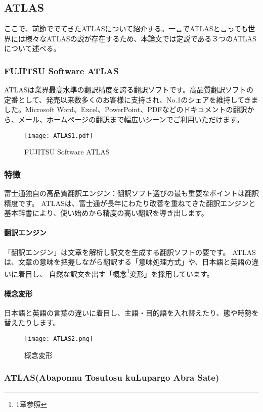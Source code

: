 \newpage
\subsection{ATLAS}
ここで、前節ででてきたATLASについて紹介する。一言でATLASと言っても世界には様々なATLASの説が存在するため、本論文では定説である３つのATLASについて述べる。

\subsubsection{FUJITSU Software ATLAS}
ATLASは業界最高水準の翻訳精度を誇る翻訳ソフトです。高品質翻訳ソフトの定番として、発売以来数多くのお客様に支持され、No.1のシェアを維持してきました。Microsoft Word、Excel、PowerPoint、PDFなどのドキュメントの翻訳から、メール、ホームページの翻訳まで幅広いシーンでご利用いただけます。

\begin{figure}[H]
\centering
\texttt{[image: ATLAS1.pdf]}
\caption{FUJITSU Software ATLAS}
\end{figure}

\subsubsection*{特徴}
富士通独自の高品質翻訳エンジン：翻訳ソフト選びの最も重要なポイントは翻訳精度です。 ATLASは、富士通が長年にわたり改善を重ねてきた翻訳エンジンと基本辞書により、使い始めから精度の高い翻訳を導き出します。
\paragraph{翻訳エンジン}
「翻訳エンジン」は文章を解析し訳文を生成する翻訳ソフトの要です。 ATLASは、文章の意味を把握しながら翻訳する「意味処理方式」や、日本語と英語の違いに着目し、 自然な訳文を出す「概念\footnote{1章参照}変形」を採用しています。
\paragraph*{概念変形}
日本語と英語の言葉の違いに着目し、主語・目的語を入れ替えたり、態や時勢を替えたりします。

\begin{figure}[H]
  \centering
  \texttt{[image: ATLAS2.png]}
  \caption{概念変形}
\end{figure}

\newpage
\subsubsection{ATLAS(Abaponnu Tosutosu kuLupargo Abra Sate)}
